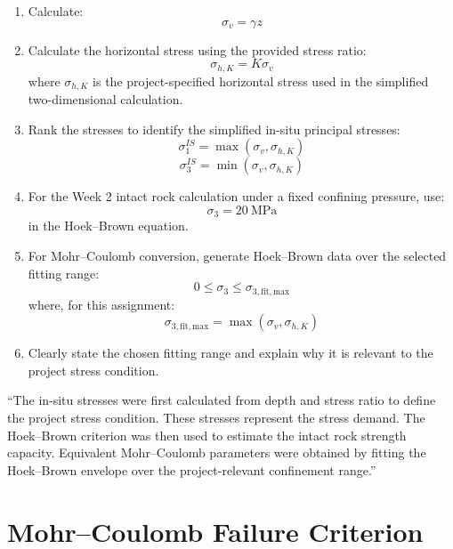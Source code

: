 \documentclass[a4paper,12pt]{article}
\begin{document}
\begin{enumerate}
    \item Calculate:
    \[
    \sigma_v = \gamma z
    \]
    
    \item Calculate the horizontal stress using the provided stress ratio:
    \[
    \sigma_{h,K} = K\sigma_v
    \]
    where \(\sigma_{h,K}\) is the project-specified horizontal stress used in the simplified
    two-dimensional calculation.
    
    \item Rank the stresses to identify the simplified in-situ principal stresses:
    \[
    \sigma_1^{IS} = \max(\sigma_v,\sigma_{h,K})
    \]
    \[
    \sigma_3^{IS} = \min(\sigma_v,\sigma_{h,K})
    \]
    
    \item For the Week 2 intact rock calculation under a fixed confining pressure, use:
    \[
    \sigma_3 = 20~\text{MPa}
    \]
    in the Hoek--Brown equation.
    
    \item For Mohr--Coulomb conversion, generate Hoek--Brown data over the selected
    fitting range:
    \[
    0 \leq \sigma_3 \leq \sigma_{3,\mathrm{fit,max}}
    \]
    where, for this assignment:
    \[
    \sigma_{3,\mathrm{fit,max}}=\max(\sigma_v,\sigma_{h,K})
    \]
    
    \item Clearly state the chosen fitting range and explain why it is relevant to the
    project stress condition.
\end{enumerate}

\begin{notebox}
``The in-situ stresses were first calculated from depth and stress ratio to define the
project stress condition. These stresses represent the stress demand. The Hoek--Brown
criterion was then used to estimate the intact rock strength capacity. Equivalent
Mohr--Coulomb parameters were obtained by fitting the Hoek--Brown envelope over the
project-relevant confinement range.''
\end{notebox}

\section{Mohr--Coulomb Failure Criterion}
\end{document}
